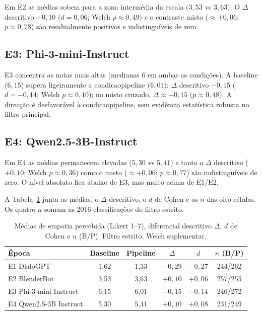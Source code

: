 Em E2 as médias sobem para a zona intermédia da escala (\(3{,}53\) vs \(3{,}63\)). O \(\Delta\) descritivo \(+0{,}10\) (\(d = 0{,}06\); Welch \(p \approx 0{,}49\)) e o contraste misto (\(\approx +0{,}06\); \(p \approx 0{,}78\)) são residualmente positivos e indistinguíveis de zero.

\subsection{E3: Phi-3-mini-Instruct}
\label{subsec:res_e3}

E3 concentra as notas mais altas (medianas 6 em ambas as condições). A \gls{baseline} (\(6{,}15\)) supera ligeiramente a \gls{condicaopipeline} (\(6{,}01\)): \(\Delta\) descritivo \(-0{,}15\) (\(d = -0{,}14\); Welch \(p \approx 0{,}10\)); no misto cruzado, \(\Delta \approx -0{,}15\) (\(p \approx 0{,}48\)). A direcção é desfavorável à \gls{condicaopipeline}, sem evidência estatística robusta no filtro principal.

\subsection{E4: Qwen2.5-3B-Instruct}
\label{subsec:res_e4}

Em E4 as médias permanecem elevadas (\(5{,}30\) vs \(5{,}41\)) e tanto o \(\Delta\) descritivo (\(+0{,}10\); Welch \(p \approx 0{,}36\)) como o misto (\(\approx +0{,}06\); \(p \approx 0{,}77\)) são indistinguíveis de zero. O nível absoluto fica abaixo de E3, mas muito acima de E1/E2.

A Tabela~\ref{tab:delta_epoca} junta as médias, o \(\Delta\) descritivo, o \(d\) de Cohen e os \(n\) das oito células. Os quatro \(n\) somam as 2016 classificações do filtro estrito.

\begin{table}[ht]
\centering
\caption[Médias de empatia percebida por época e condição.]{Médias de empatia percebida (Likert 1--7), diferencial descritivo \(\Delta\), \(d\) de Cohen e \(n\) (B/P). Filtro estrito; Welch suplementar.}
\label{tab:delta_epoca}
\begin{tabular}{lccccc}
\hline
Época & Baseline & Pipeline & \(\Delta\) & \(d\) & \(n\) (B/P) \\
\hline
E1 DialoGPT & 1{,}62 & 1{,}33 & $-0{,}29$ & $-0{,}27$ & 244/262 \\
E2 BlenderBot & 3{,}53 & 3{,}63 & $+0{,}10$ & $+0{,}06$ & 257/255 \\
E3 Phi-3-mini Instruct & 6{,}15 & 6{,}01 & $-0{,}15$ & $-0{,}14$ & 246/272 \\
E4 Qwen2.5-3B Instruct & 5{,}30 & 5{,}41 & $+0{,}10$ & $+0{,}08$ & 231/249 \\
\hline
\end{tabular}
\end{table}

